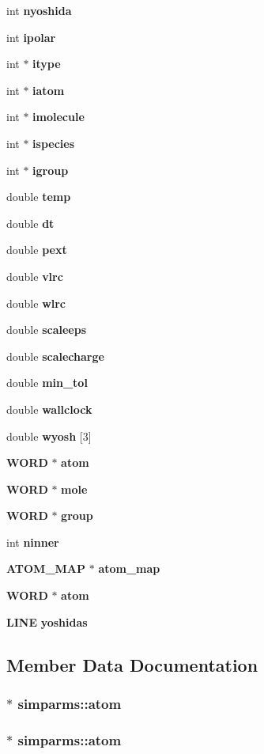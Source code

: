 \begin{CompactItemize}
int {\bf nyoshida}
\item 
int {\bf ipolar}
\item 
int $\ast$ {\bf itype}
\item 
int $\ast$ {\bf iatom}
\item 
int $\ast$ {\bf imolecule}
\item 
int $\ast$ {\bf ispecies}
\item 
int $\ast$ {\bf igroup}
\item 
double {\bf temp}
\item 
double {\bf dt}
\item 
double {\bf pext}
\item 
double {\bf vlrc}
\item 
double {\bf wlrc}
\item 
double {\bf scaleeps}
\item 
double {\bf scalecharge}
\item 
double {\bf min\_\-tol}
\item 
double {\bf wallclock}
\item 
double {\bf wyosh} [3]
\item 
{\bf WORD} $\ast$ {\bf atom}
\item 
{\bf WORD} $\ast$ {\bf mole}
\item 
{\bf WORD} $\ast$ {\bf group}
\item 
int {\bf ninner}
\item 
{\bf ATOM\_\-MAP} $\ast$ {\bf atom\_\-map}
\item 
{\bf WORD} $\ast$ {\bf atom}
\item 
{\bf LINE} {\bf yoshidas}
\end{CompactItemize}


\subsection{Member Data Documentation}
\subsubsection{$\ast$ {\bf simparms::atom}}\label{structsimparms_1a61a3c61832f3209bfad3180dbc8fbe}


\subsubsection{$\ast$ {\bf simparms::atom}}\label{structsimparms_1a61a3c61832f3209bfad3180dbc8fbe}


